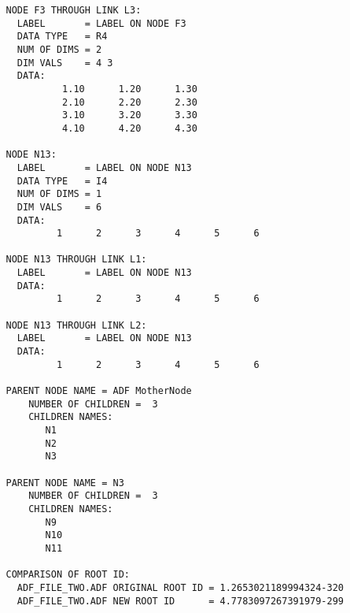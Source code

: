\begin{verbatim}
   NODE F3 THROUGH LINK L3:
     LABEL       = LABEL ON NODE F3
     DATA TYPE   = R4
     NUM OF DIMS = 2
     DIM VALS    = 4 3
     DATA:
             1.10      1.20      1.30
             2.10      2.20      2.30
             3.10      3.20      3.30
             4.10      4.20      4.30

   NODE N13:
     LABEL       = LABEL ON NODE N13
     DATA TYPE   = I4
     NUM OF DIMS = 1
     DIM VALS    = 6
     DATA:
            1      2      3      4      5      6

   NODE N13 THROUGH LINK L1:
     LABEL       = LABEL ON NODE N13
     DATA:
            1      2      3      4      5      6

   NODE N13 THROUGH LINK L2:
     LABEL       = LABEL ON NODE N13
     DATA:
            1      2      3      4      5      6

   PARENT NODE NAME = ADF MotherNode
       NUMBER OF CHILDREN =  3
       CHILDREN NAMES:
          N1
          N2
          N3

   PARENT NODE NAME = N3
       NUMBER OF CHILDREN =  3
       CHILDREN NAMES:
          N9
          N10
          N11

   COMPARISON OF ROOT ID:
     ADF_FILE_TWO.ADF ORIGINAL ROOT ID = 1.2653021189994324-320
     ADF_FILE_TWO.ADF NEW ROOT ID      = 4.7783097267391979-299
\end{verbatim}
